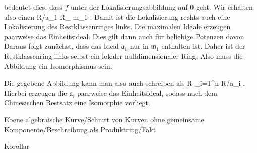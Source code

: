 {{{   }{
}

}
{}{}{}
bedeutet dies, dass $f$ unter der Lokalisierungsabbildung auf $0$ geht. Wir erhalten also einen
\maabbdisp {} { R/{\mathfrak a}_1 } { R_{ {\mathfrak m}_1 }
} {.}
Damit ist die Lokalisierung rechts auch eine Lokalisierung des Restklassenringes links. Die maximalen Ideale erzeugen paarweise das Einheitsideal. Dies gilt dann auch für beliebige Potenzen davon. Daraus folgt zunächst, dass das Ideal ${\mathfrak a}_1$ nur in ${\mathfrak m}_1$ enthalten ist. Daher ist der Restklassenring links selbst ein lokaler nulldimensionaler Ring. Also muss die Abbildung ein Isomorphismus sein.


Die gegebene Abbildung kann man also auch schreiben als
\maabbdisp {} { R } { \prod_{i=1}^n R/{\mathfrak a}_i
} {.}
Hierbei erzeugen die ${\mathfrak a}_i$ paarweise das Einheitsideal, sodass nach
dem Chinesischen Restsatz
eine Isomorphie vorliegt.


}



{Ebene algebraische Kurve/Schnitt von Kurven ohne gemeinsame Komponente/Beschreibung als Produktring/Fakt}

{Korollar}

{}

